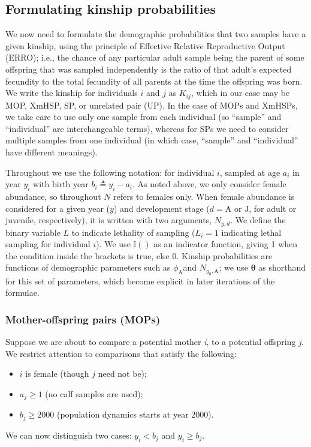 \subsection{Formulating kinship probabilities}

We now need to formulate the demographic probabilities that two samples
have a given kinship, using the principle of Effective Relative Reproductive
Output (ERRO); i.e., the chance of any particular adult sample being
the parent of some offspring that was sampled independently is the
ratio of that adult's expected fecundity to the total fecundity of
all parents at the time the offspring was born. We write the kinship
for individuals $i$ and $j$ as $K_{ij}$, which in our case may
be MOP, XmHSP, SP, or unrelated pair (UP). In the case of MOPs and
XmHSPs, we take care to use only one sample from each individual (so
``sample'' and ``individual'' are interchangeable terms), whereas
for SPs we need to consider multiple samples from one individual (in
which case, ``sample'' and ``individual'' have different meanings).

Throughout we use the following notation: for individual \emph{$i$},
sampled at age $a_{i}$ in year $y_{i}$ with birth year $b_{i}\triangleq y_{i}-a_{i}$.
As noted above, we only consider female abundance, so throughout $N$
refers to females only. When female abundance is considered for a
given year ($y$) and development stage ($d=\text{A}$ or $\text{J}$,
for adult or juvenile, respectively), it is written with two arguments,
$N_{y,d}$. We define the binary variable $L$ to indicate lethality
of sampling ($L_{i}=1$ indicating lethal sampling for individual
$i$). We use $\mathbb{I}()$ as an indicator function, giving 1 when
the condition inside the brackets is true, else 0. Kinship probabilities
are functions of demographic parameters such as $\phi_{\text{A}}$and
$N_{y_{0},\text{A}}$; we use $\boldsymbol{\theta}$ as shorthand
for this set of parameters, which become explicit in later iterations
of the formulae.

\subsubsection{Mother-offspring pairs (MOPs)}

Suppose we are about to compare a potential mother \emph{i}, to a
potential offspring \emph{j}. We restrict attention to comparisons
that satisfy the following:
\begin{itemize}
\item \emph{$i$} is female (though \emph{$j$} need not be);
\item $a_{j}\geqslant1$ (no calf samples are used);
\item $b_{j}\geqslant2000$ (population dynamics starts at year 2000).
\end{itemize}
We can now distinguish two cases: $y_{i}<b_{j}$ and $y_{i}\geqslant b_{j}$.

